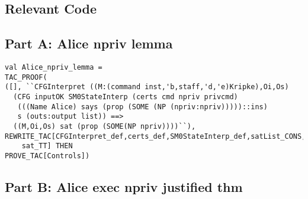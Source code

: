 \documentclass{article}
\begin{document}
\HOLSMZeroDatatypes

\HOLSMZeroTheoremsinputOKXXdef

\HOLSMZeroDefinitionscertsXXdef

\subsection{Relevant Code}
\label{sec:relevant-code}

\subsection{Part A: Alice npriv lemma}
\label{sec:part-a:-alice}


\HOLSMZeroSolutionsTheoremsAliceXXnprivXXlemma


\begin{verbatim}
val Alice_npriv_lemma =
TAC_PROOF(
([], ``CFGInterpret ((M:(command inst,'b,staff,'d,'e)Kripke),Oi,Os)
  (CFG inputOK SM0StateInterp (certs cmd npriv privcmd)
   (((Name Alice) says (prop (SOME (NP (npriv:npriv)))))::ins)
   s (outs:output list)) ==>
  ((M,Oi,Os) sat (prop (SOME(NP npriv))))``), 
REWRITE_TAC[CFGInterpret_def,certs_def,SM0StateInterp_def,satList_CONS,satList_nil,
	sat_TT] THEN
PROVE_TAC[Controls])
\end{verbatim}

\subsection{Part B: Alice exec npriv justified thm}
\label{sec:part-b:-alice}


\HOLSMZeroSolutionsTheoremsAliceXXexecXXnprivXXjustifiedXXthm

\end{document}
